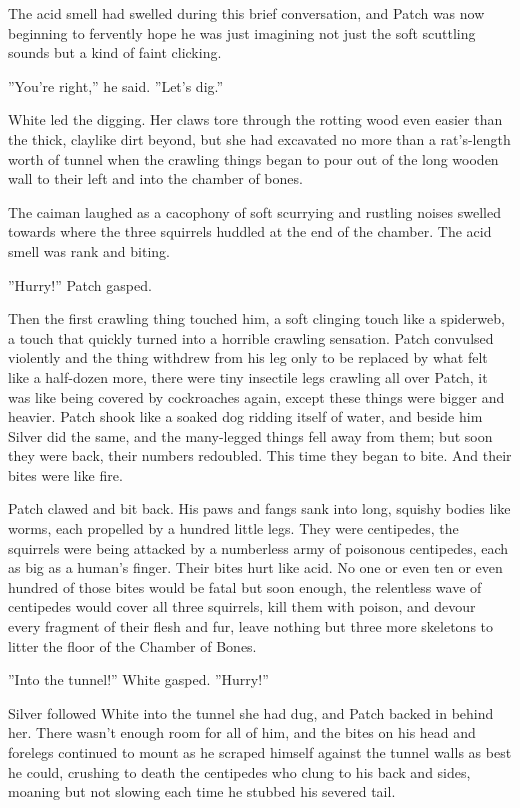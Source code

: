 \documentclass[11pt]{article}
\begin{document}
 The acid smell had swelled during this brief conversation, and Patch was now beginning to fervently hope he was just imagining not just the soft scuttling sounds but a kind of faint clicking.\par
 ''You're right,'' he said. ''Let's dig.''\par
 White led the digging. Her claws tore through the rotting wood even easier than the thick, claylike dirt beyond, but she had excavated no more than a rat's-length worth of tunnel when the crawling things began to pour out of the long wooden wall to their left and into the chamber of bones.\par
The caiman laughed as a cacophony of soft scurrying and rustling noises swelled towards where the three squirrels huddled at the end of the chamber. The acid smell was rank and biting.\par
 ''Hurry!'' Patch gasped.\par
Then the first crawling thing touched him, a soft clinging touch like a spiderweb, a touch that quickly turned into a horrible crawling sensation. Patch convulsed violently and the thing withdrew from his leg %
 only to be replaced by what felt like a half-dozen more, there were tiny insectile legs crawling all over Patch, it was like being covered by cockroaches again, except these things were bigger and heavier. Patch shook like a soaked dog ridding itself of water, and beside him Silver did the same, and the many-legged things fell away from them; but soon they were back, their numbers redoubled. This time they began to bite. And their bites were like fire.\par
 Patch clawed and bit back. His paws and fangs sank into long, squishy bodies like worms, each propelled by a hundred little legs. They were centipedes, the squirrels were being attacked by a numberless army of poisonous centipedes, each as big as a human's finger. Their bites hurt like acid. No one or even ten or even hundred of those bites would be fatal %
 but soon enough, the relentless wave of centipedes would cover all three squirrels, kill them with poison, and devour every fragment of their flesh and fur, leave nothing but three more skeletons to litter the floor of the Chamber of Bones.\par
 ''Into the tunnel!'' White gasped. ''Hurry!''\par
 Silver followed White into the tunnel she had dug, and Patch backed in behind her. There wasn't enough room for all of him, and the bites on his head and forelegs continued to mount as he scraped himself against the tunnel walls as best he could, crushing to death the centipedes who clung to his back and sides, moaning but not slowing each time he stubbed his severed tail.\par
\end{document}
